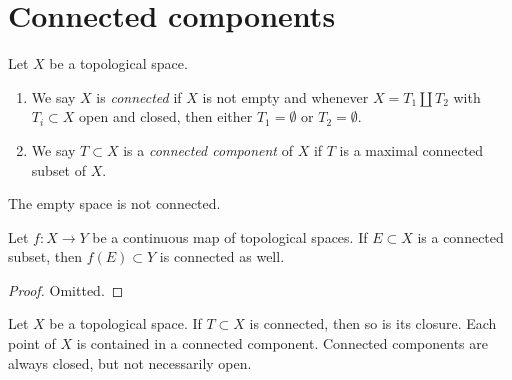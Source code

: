 \section{Connected components}
\label{section-connected-components}

\begin{definition}
\label{definition-connected-components}
Let $X$ be a topological space.
\begin{enumerate}
\item We say $X$ is {\it connected} if $X$ is not empty and whenever
$X = T_1 \coprod T_2$ with $T_i \subset X$ open and closed, then either
$T_1 = \emptyset$ or $T_2 = \emptyset$.
\item We say $T \subset X$ is a {\it connected component} of $X$ if
$T$ is a maximal connected subset of $X$.
\end{enumerate}
\end{definition}

\noindent
The empty space is not connected.

\begin{lemma}
\label{lemma-image-connected-space}
Let $f : X \to Y$ be a continuous map of topological spaces.
If $E \subset X$ is a connected subset, then $f(E) \subset Y$
is connected as well.
\end{lemma}

\begin{proof}
Omitted.
\end{proof}

\begin{lemma}
\label{lemma-connected-components}
Let $X$ be a topological space. If $T \subset X$ is connected,
then so is its closure. Each point of $X$ is contained
in a connected component. Connected components are always closed,
but not necessarily open.
\end{lemma}

